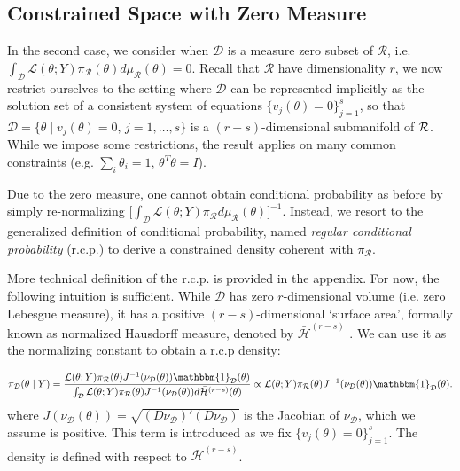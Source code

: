 \documentclass[10pt,fleqn]{article}
\DeclareMathOperator{\1}{\mathbbm{1}} \DeclareMathOperator{\bigO}{\mc O}
\begin{document}
\subsection{Constrained Space with Zero Measure}
\label{SEC:Zero_Measure_Methods}

In the second case, we consider when $\mathcal{D}$
is a measure zero subset of $\mathcal{R}$, i.e.
$\int_\mathcal{D}\mathcal{L}(\theta;Y)\pi_\mathcal{R}(\theta)d\mu_\mathcal{R}(\theta)=0$.
Recall that $\mathcal{R}$ have dimensionality $r$, we now restrict
ourselves to the setting where $\mathcal{D}$ can be represented implicitly
as the solution set of a consistent system of equations $\{v_j(\theta) =
0\}_{j=1}^s$, so that $\mathcal{D} =\{\theta \mid v_j(\theta) =0, \, j =
1, \dots,s\}$ is a $(r-s)$-dimensional submanifold of $\mathcal{R}$.  While we
impose some restrictions, the result applies on many common constraints (e.g.
$\sum_i \theta_i = 1$, $\theta^T\theta=I$).

Due to the zero measure, one cannot obtain
conditional probability as before by simply re-normalizing
$\big[\int_\mathcal{D}\mathcal{L}(\theta;Y)\pi_\mathcal{R}d\mu_\mathcal{R}(\theta)\big]^{-1}.$
Instead, we resort to the generalized definition of conditional
probability, named \emph{regular conditional probability} (r.c.p.)
\citep{kolmogorov1950foundations} to derive a constrained density coherent
with $\pi_\mathcal{R}.$

More technical definition of the r.c.p. is provided in the appendix. For
now, the following intuition is sufficient. While $\mathcal{D}$ has zero
$r$-dimensional volume (i.e. zero Lebesgue measure), it has a positive
$(r-s)$-dimensional `surface area', formally known as normalized Hausdorff
measure, denoted by $\bar{\mathcal{H}}^{(r-s)}$ . We can use it as the
normalizing constant to obtain a r.c.p density:

$$\pi_{\mc D}(\theta \mid Y) = \dfrac{
{\mathcal{L}(\theta;Y)\pi_\mathcal{R}(\theta)}{J^{-1}(\nu_\mathcal{D}(\theta))
\mathbbm{1}_{\mc D}(\theta)
}
} {\int_\mathcal{D}
{\mathcal{L}(\theta;Y)\pi_\mathcal{R}(\theta)}{J^{-1}(\nu_\mathcal{D}(\theta))}
d\bar{\mathcal{H}}^{(r-s)}(\theta)} \propto
{\mathcal{L}(\theta;Y)\pi_\mathcal{R}(\theta)}{J^{-1}(\nu_\mathcal{D}(\theta))
\mathbbm{1}_{\mc D}(\theta)
}.
$$
where $J(\nu_\mathcal{D}(\theta)) =
\sqrt{(D\nu_\mathcal{D})'(D\nu_\mathcal{D})}$ is the Jacobian
of $\nu_\mathcal{D}$, which we assume is positive. This term is
introduced as we fix $\{v_j(\theta)=0\}_{j=1}^{s}$.  The density is
defined with respect to $\bar{\mathcal{H}}^{(r-s)}$.
\end{document}
